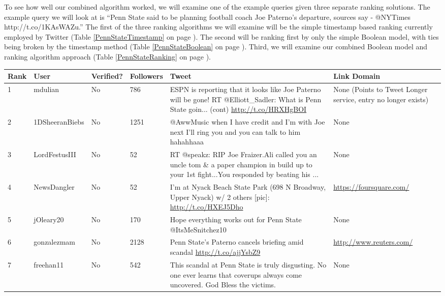 \documentclass[10pt]{proc}
\begin{document}
  To see how well our combined algorithm worked, we will examine one of the example queries given three separate ranking solutions. The example query we will look at is ``Penn State said to be planning football coach Joe Paterno's departure, sources say - @NYTimes http://t.co/1KAsWAZu.'' The first of the three ranking algorithms we will examine will be the simple timestamp based ranking currently employed by Twitter (Table \ref{PennStateTimestamp} on page \pageref{PennStateTimestamp}). The second will be ranking first by only the simple Boolean model, with ties being broken by the timestamp method (Table \ref{PennStateBoolean} on page \pageref{PennStateBoolean}). Third, we will examine our combined Boolean model and ranking algorithm approach (Table \ref{PennStateRanking} on page \pageref{PennStateRanking}).

  \begin{table*}
    \begin{tabular}{| l | l | l | l | p{6.5cm} | p{2cm} |}
      \hline
      Rank & User & Verified? & Followers & Tweet & Link Domain \\
      \hline
      1 & mdulian & No & 786 & ESPN is reporting that it looks like Joe Paterno will be gone! RT @Elliott\_Sadler: What is Penn State goin... (cont) \url{http://t.co/HRXHgBOI} & None (Points to Tweet Longer service, entry no longer exists) \\
      \hline
      2 & 1DSheeranBiebs & No & 1251 & @AwwMusic when I have credit and I'm with Joe next I'll ring you and you can talk to him hahahhaaa & None \\
      \hline
      3 & LordFestusIII & No & 52 & RT @speakz: RIP Joe Fraizer.Ali called you an uncle tom \& a paper champion in build up to your 1st fight...You responded by beating his  ... & None \\
      \hline
      4 & NewsDangler & No & 52 & I'm at Nyack Beach State Park (698 N Broadway, Upper Nyack) w/ 2 others [pic]: \url{http://t.co/HXEJ5Dho} & \url{https://foursquare.com/} \\
      \hline
      5 & jOleary20 & No & 170 & Hope everything works out for Penn State @ItsMeSnitchez10 & None \\
      \hline
      6 & gonzalezmam & No & 2128 & Penn State's Paterno cancels briefing amid scandal \url{http://t.co/ajjYsbZ9} & \url{http://www.reuters.com/} \\
      \hline
      7 & freehan11 & No & 542 & This scandal at Penn State is truly disgusting. No one ever learns that coverups always come uncovered. God Bless the victims. & None \\

\end{tabular}
\end{table*}
\end{document}
